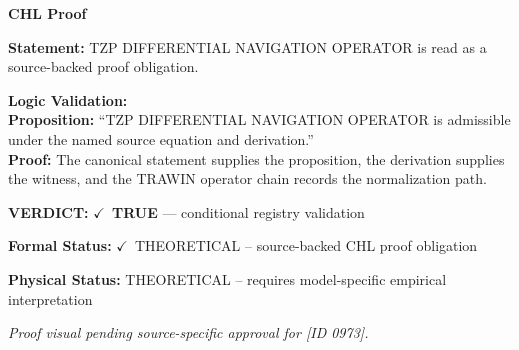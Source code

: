 \vspace{0.45em}
\noindent\textbf{CHL Proof}\par
\textbf{Statement:} TZP DIFFERENTIAL NAVIGATION OPERATOR is read as a source-backed proof obligation.

\textbf{Logic Validation:}\\
\textbf{Proposition:} ``TZP DIFFERENTIAL NAVIGATION OPERATOR is admissible under the named source equation and derivation.''\\
\textbf{Proof:} The canonical statement supplies the proposition, the derivation supplies the witness, and the TRAWIN operator chain records the normalization path.

\textbf{VERDICT:} \ensuremath{\checkmark}\ \textbf{TRUE} --- conditional registry validation

\textbf{Formal Status:} \ensuremath{\checkmark}\ THEORETICAL -- source-backed CHL proof obligation

\textbf{Physical Status:} THEORETICAL -- requires model-specific empirical interpretation
\par\vspace{0.45em}
\par
\vfill
\begingroup\footnotesize\itshape
Proof visual pending source-specific approval for [ID 0973].
\par\endgroup
\vfill
\endgroup
\endgroup
